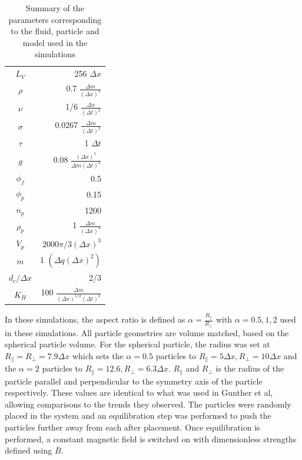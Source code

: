 \begin{table}
    \centering
    \caption{Summary of the parameters corresponding to the fluid, particle and model used in the simulations}
    \label{table:model_params}
    \begin{tabular}{|c|r|}
    \hline
    $L_V$ & 256 $\Delta x$ \\
    $\rho$ & 0.7 $ \frac{\Delta m}{(\Delta x)^3}$\\
    $\nu$ & 1/6 $\frac{\Delta x}{(\Delta t)^2}$ \\
    $\sigma $ & 0.0267 $\frac{\Delta m}{(\Delta t)^2}$ \\
    $\tau$ & 1 $\Delta t$\\
    $g$ & 0.08 $\frac{(\Delta x)^5}{\Delta m(\Delta t)^2}$\\
    $\phi_f$ & 0.5 \\
    $\phi_p$ & 0.15 \\
    $n_p$ & 1200 \\
    $\rho_p$ & 1 $ \frac{\Delta m}{(\Delta x)^3}$\\
    $V_p$ & $2000\pi/3 (\Delta x)^3$ \\
    $m$ & 1 $(\Delta q(\Delta x)^2)$\\
    $d_c/\Delta x$ & 2/3 \\
    $K_H$ & 100 $\frac{\Delta m}{(\Delta x)^{1/2}(\Delta t)^2} $\\
    \hline
    \end{tabular}
\end{table}

In these simulations, the aspect ratio is defined as $\alpha = \frac{R_{\parallel}}{R_{\perp}}$ with $\alpha = 0.5, 1, 2$ 
used in these simulations. All particle geometries are volume matched, based on the spherical particle volume. For the 
spherical particle, the radius was set at $R_{\parallel} = R_{\perp} = 7.9 \Delta x$ which sets the $\alpha = 0.5$ particles to 
$R_{\parallel} = 5 \Delta x, R_{\perp} = 10 \Delta x$ and the $\alpha = 2$ particles to $R_{\parallel} = 12.6, R_{\perp} = 6.3 \Delta x$. 
$R_{\parallel}$ and $R_{\perp}$ is the radius of the particle parallel and perpendicular to the symmetry axis of 
the particle respectively. These values are identical to what was used in Gunther et al, allowing comparisons to the 
trends they observed. \cite{gunther_timescales_2014} The particles were randomly placed in the system and an equilibration
step was performed to push the particles further away from each after placement. Once equilibration is performed, a 
constant magnetic field is switched on with dimensionless strengths defined using $\bar{B}$.

